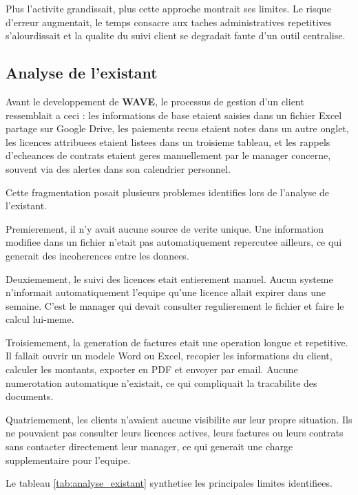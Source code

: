\documentclass[12pt, a4paper]{report}
\newcommand{\wave}{\textbf{\color{WaveBlue}WAVE}}
\begin{document}
Plus l'activite grandissait, plus cette approche montrait ses limites. Le risque
d'erreur augmentait, le temps consacre aux taches administratives repetitives
s'alourdissait et la qualite du suivi client se degradait faute d'un outil
centralise.

\subsection{Analyse de l'existant}

Avant le developpement de \wave{}, le processus de gestion d'un client
ressemblait a ceci : les informations de base etaient saisies dans un fichier
Excel partage sur Google Drive, les paiements recus etaient notes dans un
autre onglet, les licences attribuees etaient listees dans un troisieme
tableau, et les rappels d'echeances de contrats etaient geres manuellement
par le manager concerne, souvent via des alertes dans son calendrier personnel.

Cette fragmentation posait plusieurs problemes identifies lors de l'analyse
de l'existant.

Premierement, il n'y avait aucune source de verite unique. Une information
modifiee dans un fichier n'etait pas automatiquement repercutee ailleurs,
ce qui generait des incoherences entre les donnees.

Deuxiemement, le suivi des licences etait entierement manuel. Aucun systeme
n'informait automatiquement l'equipe qu'une licence allait expirer dans une
semaine. C'est le manager qui devait consulter regulierement le fichier et
faire le calcul lui-meme.

Troisiemement, la generation de factures etait une operation longue et
repetitive. Il fallait ouvrir un modele Word ou Excel, recopier les
informations du client, calculer les montants, exporter en PDF et envoyer
par email. Aucune numerotation automatique n'existait, ce qui compliquait
la tracabilite des documents.

Quatriemement, les clients n'avaient aucune visibilite sur leur propre
situation. Ils ne pouvaient pas consulter leurs licences actives, leurs
factures ou leurs contrats sans contacter directement leur manager, ce qui
generait une charge supplementaire pour l'equipe.

Le tableau \ref{tab:analyse_existant} synthetise les principales limites
identifiees.
\end{document}
